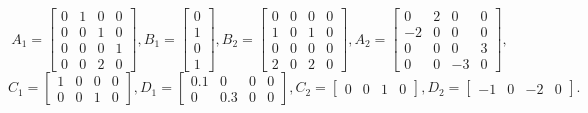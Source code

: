 \begin{equation*}
    A_1 = \begin{bmatrix}
        0 & 1 & 0 & 0 \\
        0 & 0 & 1 & 0 \\
        0 & 0 & 0 & 1 \\
        0 & 0 & 2 & 0
    \end{bmatrix}, 
    B_1 = \begin{bmatrix}
        0 \\ 1 \\ 0 \\ 1
    \end{bmatrix},
    B_2 = \begin{bmatrix}
        0 & 0 & 0 & 0 \\
        1 & 0 & 1 & 0 \\
        0 & 0 & 0 & 0 \\
        2 & 0 & 2 & 0
    \end{bmatrix}, 
    A_2 = \begin{bmatrix}
        0 & 2 & 0 & 0 \\
        -2 & 0 & 0 & 0 \\
        0 & 0 & 0 & 3 \\
        0 & 0 & -3 & 0
    \end{bmatrix}, 
\end{equation*}
\begin{equation*}
    C_1 = \begin{bmatrix}
        1 & 0 & 0 & 0 \\
        0 & 0 & 1 & 0
    \end{bmatrix},
    D_1 = \begin{bmatrix}
        0.1 & 0 & 0 & 0 \\
        0 & 0.3 & 0 & 0
    \end{bmatrix},
    C_2 = \begin{bmatrix}
        0 & 0 & 1 & 0
    \end{bmatrix},
    D_2 = \begin{bmatrix}
        -1 & 0 & -2 & 0
    \end{bmatrix}.
\end{equation*}

